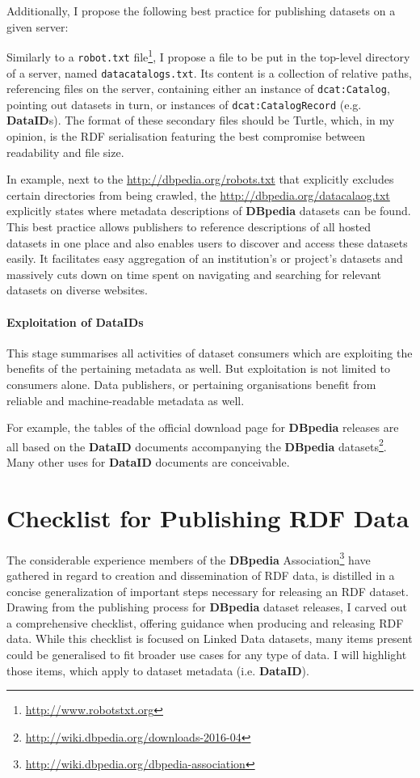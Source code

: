 \documentclass[a4paper,english,twoside,BCOR1.5cm,headsepline,DIV12,appendixprefix,final,12pt]{scrbook}
\newcommand{\dataid}{{\ttfamily\bfseries DataID}\xspace}
\newcommand{\dbpedia}{{\ttfamily\bfseries DBpedia}\xspace}
\newcommand{\prop}[1]{{{\texttt{#1}}}}
\newcommand\footnoteurl[1]{\footnote{\scriptsize\url{#1}}}
\begin{document}
Additionally, I propose the following best practice for publishing datasets on a given server:

Similarly to a \prop{robot.txt} file\footnoteurl{http://www.robotstxt.org}, I propose a file
to be put in the top-level directory of a server, named \prop{datacatalogs.txt}. Its content is a collection of relative paths, referencing files on the server, containing either an instance of \prop{dcat:Catalog}, pointing out datasets in turn, or instances of \prop{dcat:CatalogRecord} (e.g. \dataid{}s).
The format of these secondary files should be Turtle, which, in my opinion, is the RDF
serialisation featuring the best compromise between readability and file size. 

In example, next to the \url{http://dbpedia.org/robots.txt}
that explicitly excludes certain directories from being crawled,
the \url{http://dbpedia.org/datacalaog.txt} explicitly states where
metadata descriptions of \dbpedia datasets can be found. 
This best practice allows publishers to
reference descriptions of all hosted datasets in one place
and also enables users to discover and access these
datasets easily. It facilitates easy aggregation of an institution’s
or project’s datasets and massively cuts down on time
spent on navigating and searching for relevant datasets on
diverse websites.

\paragraph{Exploitation of DataIDs}
\label{sec:wfexploit}
This stage summarises all activities of dataset consumers which are exploiting the benefits of the pertaining metadata as well. But exploitation is not limited to consumers alone. Data publishers, or pertaining organisations benefit from reliable and machine-readable metadata as well.

For example, the tables of the official download page for \dbpedia releases are all based on the \dataid documents accompanying the \dbpedia datasets\footnoteurl{http://wiki.dbpedia.org/downloads-2016-04}. Many other uses for \dataid documents are conceivable.

\section{Checklist for Publishing RDF Data} 
\label{sec:checklist}

The considerable experience members of the \dbpedia Association\footnoteurl{http://wiki.dbpedia.org/dbpedia-association} have gathered in regard to creation and dissemination of RDF data, is distilled in a concise generalization of important steps necessary for releasing an RDF dataset. Drawing from the publishing process for \dbpedia dataset releases, I  carved  out  a comprehensive checklist, offering guidance when producing and releasing RDF data. While this checklist is focused on Linked Data datasets, many items present could be generalised to fit broader use cases for any type of data. I will highlight those items, which apply to dataset metadata (i.e. \dataid).
\end{document}
